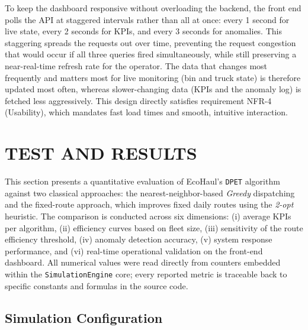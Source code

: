 \documentclass[12pt,a4paper]{report}
\begin{document}
\indent To keep the dashboard responsive without overloading the backend, the front end polls the API at staggered intervals rather than all at once: every 1 second for live state, every 2 seconds for KPIs, and every 3 seconds for anomalies. This staggering spreads the requests out over time, preventing the request congestion that would occur if all three queries fired simultaneously, while still preserving a near-real-time refresh rate for the operator. The data that changes most frequently and matters most for live monitoring (bin and truck state) is therefore updated most often, whereas slower-changing data (KPIs and the anomaly log) is fetched less aggressively. This design directly satisfies requirement NFR-4 (Usability), which mandates fast load times and smooth, intuitive interaction.

%

\chapter{TEST AND RESULTS}
\label{chap:test}

\indent This section presents a quantitative evaluation of EcoHaul’s \texttt{DPET} algorithm against two classical approaches: the nearest-neighbor-based \textit{Greedy} dispatching and the fixed-route approach, which improves fixed daily routes using the \textit{2-opt} heuristic. The comparison is conducted across six dimensions: (i) average KPIs per algorithm, (ii) efficiency curves based on fleet size, (iii) sensitivity of the route efficiency threshold, (iv) anomaly detection accuracy, (v) system response performance, and (vi) real-time operational validation on the front-end dashboard. All numerical values were read directly from counters embedded within the \texttt{SimulationEngine} core; every reported metric is traceable back to specific constants and formulas in the source code.

\section{Simulation Configuration}
\label{sec:test_sim_config}
\end{document}

